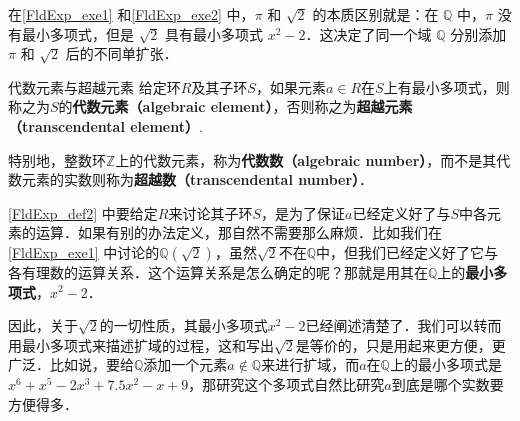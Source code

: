 在\autoref{FldExp_exe1} 和\autoref{FldExp_exe2} 中，$\pi$ 和 $\sqrt{2}$ 的本质区别就是：在 $\mathbb{Q}$ 中，$\pi$ 没有最小多项式，但是 $\sqrt{2}$ 具有最小多项式 $x^2-2$．这决定了同一个域 $\mathbb{Q}$ 分别添加 $\pi$ 和 $\sqrt{2}$ 后的不同单扩张．

\begin{definition}{代数元素与超越元素}\label{FldExp_def2}
给定环$R$及其子环$S$，如果元素$a\in R$在$S$上有最小多项式，则称之为$S$的\textbf{代数元素（algebraic element）}，否则称之为\textbf{超越元素（transcendental element）}.

特别地，整数环$\mathbb{Z}$上的代数元素，称为\textbf{代数数（algebraic number）}，而不是其代数元素的实数则称为\textbf{超越数（transcendental number）}．
\end{definition}

\autoref{FldExp_def2} 中要给定$R$来讨论其子环$S$，是为了保证$a$已经定义好了与$S$中各元素的运算．如果有别的办法定义，那自然不需要那么麻烦．比如我们在\autoref{FldExp_exe1} 中讨论的$\mathbb{Q}(\sqrt{2})$，虽然$\sqrt{2}$不在$\mathbb{Q}$中，但我们已经定义好了它与各有理数的运算关系．这个运算关系是怎么确定的呢？那就是用其在$\mathbb{Q}$上的\textbf{最小多项式}，$x^2-2$．







因此，关于$\sqrt{2}$的一切性质，其最小多项式$x^2-2$已经阐述清楚了．我们可以转而用最小多项式来描述扩域的过程，这和写出$\sqrt{2}$是等价的，只是用起来更方便，更广泛．比如说，要给$\mathbb{Q}$添加一个元素$a\not\in \mathbb{Q}$来进行扩域，而$a$在$\mathbb{Q}$上的最小多项式是$x^6+x^5-2x^3+7.5x^2-x+9$，那研究这个多项式自然比研究$a$到底是哪个实数要方便得多．






